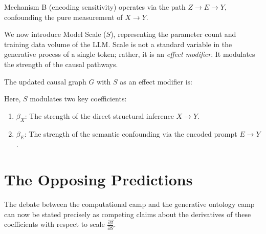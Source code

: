 \documentclass[12pt,a4paper]{article}
\begin{document}
Mechanism B (encoding sensitivity) operates via the path $Z \rightarrow E \rightarrow Y$, confounding the pure measurement of $X \rightarrow Y$.

We now introduce Model Scale ($S$), representing the parameter count and training data volume of the LLM. Scale is not a standard variable in the generative process of a single token; rather, it is an \emph{effect modifier}. It modulates the strength of the causal pathways.

The updated causal graph $G$ with $S$ as an effect modifier is:
\begin{center}
\end{center}

Here, $S$ modulates two key coefficients:
\begin{enumerate}
    \item $\beta_X$: The strength of the direct structural inference $X \rightarrow Y$.
    \item $\beta_E$: The strength of the semantic confounding via the encoded prompt $E \rightarrow Y$.
\end{enumerate}

\section{The Opposing Predictions}

The debate between the computational camp and the generative ontology camp can now be stated precisely as competing claims about the derivatives of these coefficients with respect to scale $\frac{\partial \beta}{\partial S}$.
\end{document}
